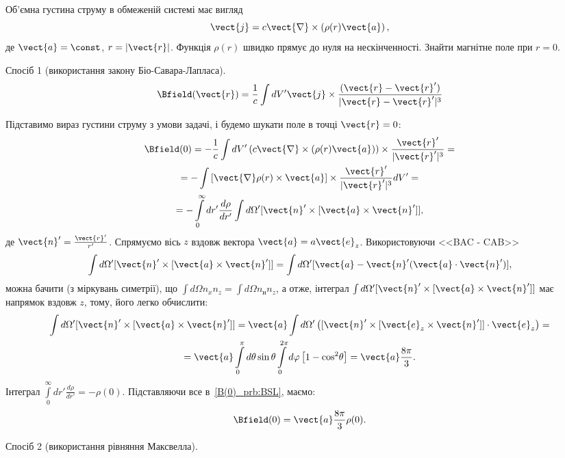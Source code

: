\begin{problem}
Об'ємна густина струму в обмеженій системі має вигляд
\[
	\vect{j} = c\vect{\nabla}\times \left( \rho(r) \vect{a}\right),
\]
де $\vect{a} = \const$, $r = |\vect{r}|$.  Функція $\rho(r)$  швидко прямує до нуля на нескінченності. Знайти магнітне поле при  $r = 0$.
\begin{solution}
	Спосіб 1 (використання закону Біо-Савара-Лапласа).
	\[
		\Bfield(\vect{r}) = \frac1c \int dV' \vect{j} \times \frac{(\vect{r} - \vect{r}')}{|\vect{r} - \vect{r}'|^3}
	\]

	Підставимо вираз густини струму з умови задачі, і будемо шукати поле в точці $\vect{r} = 0$:
	\begin{multline}\label{B(0)_prb:BSL}
		\Bfield(0) = -\frac1c \int dV' \left( c\vect{\nabla}\times \left( \rho(r) \vect{a}\right) \right) \times \frac{\vect{r}'}{|\vect{r}'|^3} = \\
		= -\int \left[ \vect{\nabla}\rho(r)\times\vect{a} \right] \times \frac{\vect{r}'}{|\vect{r}'|^3} dV' = \\
		= -\int\limits_0^{\infty} dr'\frac{d\rho}{dr'} \int d\Omega' [{\vect{n}}' \times [{\vect{a}} \times {\vect{n}}']],
	\end{multline}
	де $\vect{n}' = \frac{\vect{r}'}{r'}$. Спрямуємо вісь $z$ вздовж вектора  $\vect{a} = a\vect{e}_z$. Використовуючи <<BAC - CAB>>
	\[
		\int {d\Omega'} [{\vect{n}}' \times [{\vect{a}} \times {\vect{n}}']] = \int {d\Omega'} [\vect{a} - \vect{n}'(\vect{a} \cdot {\vect{n}}')],
	\]
	можна бачити (з міркувань симетрії), що  $\int d\Omega n_x n_z = \int d\Omega n_н n_z $, а отже, інтеграл  $\int {d\Omega'} [{\vect{n}}' \times [{\vect{a}} \times {\vect{n}}']] $ має напрямок вздовж $z$, тому, його легко обчислити:
	\begin{multline}
		\int d\Omega' [{\vect{n}}' \times [{\vect{a}} \times {\vect{n}}']] = {\vect{a}}\int {d\Omega'} \left( {[{\vect{n}}' \times [{{\vect{e}}_z} \times {\vect{n}}']] \cdot {{\vect{e}}_z}} \right) = \\
		= \vect{a}\int\limits_0^\pi  {d\theta } \sin \theta \int\limits_0^{2\pi } {d\varphi } \left[ {1 - {\cos^2}\theta } \right] = \vect{a}\frac{8\pi}{3}.
	\end{multline}
	Інтеграл $\int\limits_0^{\infty} dr'\frac{d\rho}{dr'} = -\rho(0)$.
	Підставляючи все в~\eqref{B(0)_prb:BSL}, маємо:
	\[
		\Bfield(0) = \vect{a}\frac{8\pi}{3}\rho(0).
	\]

	Спосіб 2 (використання рівняння Максвелла).


\end{solution}
\end{problem}
